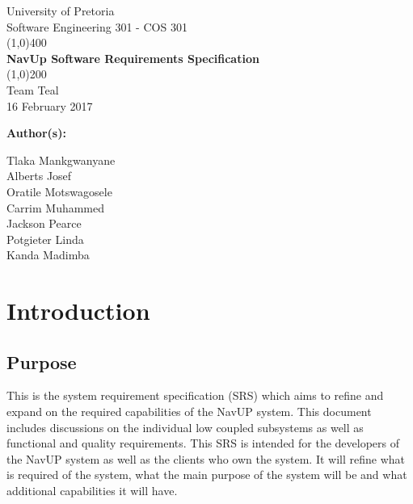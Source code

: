 \documentclass[12pt, a4paper]{article}
\begin{document}
\begin{titlepage}
	\begin{center}
	\huge{University of Pretoria\\
	Software Engineering 301 - COS 301}\\
	\line(1,0){400}\\
	\huge{\bfseries NavUp Software Requirements Specification}\\
	\line(1,0){200}\\
	Team Teal\\
	16 February 2017\\
	[3cm]
	\end{center}
	\begin{flushleft}
	\bfseries{Author(s):}
	\end{flushleft}
	\begin{flushleft}
	Tlaka Mankgwanyane	\\
	Alberts Josef			\\
	Oratile Motswagosele	\\
	Carrim Muhammed		\\
	Jackson Pearce			\\
	Potgieter Linda		\\
	Kanda Madimba			\\
	\end{flushleft}
\end{titlepage}

\tableofcontents

\section{Introduction}
\subsection{Purpose} 
This is the system requirement specification (SRS) which aims to refine and expand on the required capabilities of the NavUP system.
This document includes discussions on the individual low coupled subsystems as well as functional and quality requirements. This SRS is intended for the developers of the NavUP system as well as the clients who own the system. It will refine what is required of the system, what the main purpose of the system will be and what additional capabilities it will have.\\
\end{document}

